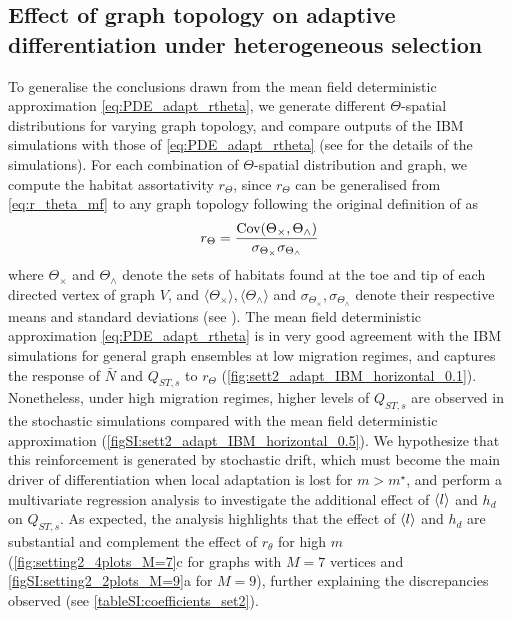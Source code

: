 \subsection{Effect of graph topology on adaptive differentiation under heterogeneous selection}\label{sec:result2b}
To generalise the conclusions drawn from the mean field deterministic approximation \cref{eq:PDE_adapt_rtheta}, we generate different $\Theta$-spatial distributions for varying graph topology, and compare outputs of the IBM simulations with those of \cref{eq:PDE_adapt_rtheta} (see  for the details of the simulations). For each combination of $\Theta$-spatial distribution and graph, we compute the habitat assortativity $r_\Theta$, since $r_\Theta$ can be generalised from \cref{eq:r_theta_mf} to any graph topology following the original definition of \cite{Newman2003a} as
\begin{equation}\label{eq:r_theta}
  r_\Theta = \frac{\mbox{Cov}({ \Theta}_\times, { \Theta}_\wedge)}{\sigma_{{ \Theta}_\times} \sigma_{{ \Theta}_\wedge}}
\end{equation}
where ${ \Theta}_\times$ and ${ \Theta}_\wedge$ denote the sets of habitats found at the toe and tip of each directed vertex of graph $V$, and $\langle { \Theta}_\times \rangle, \langle {\Theta}_\wedge \rangle$ and $\sigma_{{\Theta}_\times}, \sigma_{{\Theta}_\wedge}$ denote their respective means and standard deviations (see ). 
%
The mean field deterministic approximation \cref{eq:PDE_adapt_rtheta} is in very good agreement with the IBM simulations for general graph ensembles at low migration regimes, and captures the response of $\bar{N}$ and $Q_{ST,s}$ to $r_\Theta$ (\cref{fig:sett2_adapt_IBM_horizontal_0.1}). Nonetheless, under high migration regimes, higher levels of $Q_{ST,s}$ are observed in the stochastic simulations compared with the mean field deterministic approximation (\cref{figSI:sett2_adapt_IBM_horizontal_0.5}). We hypothesize that this reinforcement is generated by stochastic drift, which must become the main driver of differentiation when local adaptation is lost for $m>m^\star$, and perform a multivariate regression analysis to investigate the additional effect of $\langle l \rangle$ and $h_d$ on $Q_{ST,s}$. As expected, the analysis highlights that the effect of $\langle l \rangle$ and $h_d$ are substantial and complement the effect of $r_\theta$ for high $m$ (\cref{fig:setting2_4plots_M=7}c for graphs with $M = 7$ vertices and \cref{figSI:setting2_2plots_M=9}a for $M=9$), further explaining the discrepancies observed (see \cref{tableSI:coefficients_set2}).

